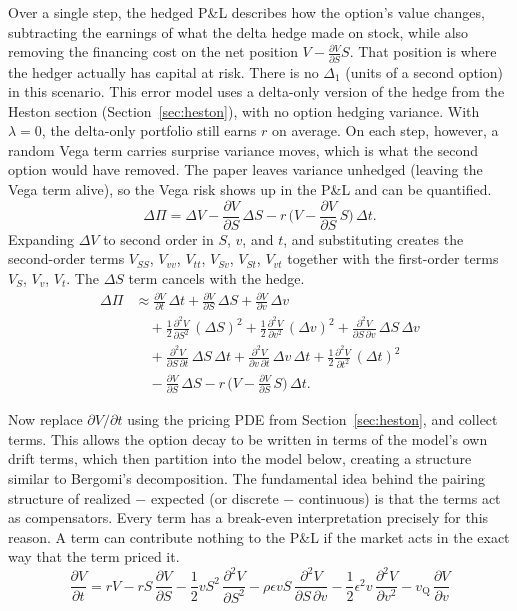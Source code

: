 \documentclass[11pt]{article}
\begin{document}
Over a single step, the hedged P\&L describes how the option's value changes, subtracting the earnings of what the delta hedge made on stock, while also removing the financing cost on the net position $V - \tfrac{\partial V}{\partial S}S$.
That position is where the hedger actually has capital at risk. There is no $\Delta_1$ (units of a second option) in this scenario.
This error model uses a delta-only version of the hedge from the Heston section (Section~\ref{sec:heston}), with no option hedging variance. With $\lambda = 0$, the delta-only portfolio still earns $r$ on average. On each step, however, a random Vega term carries surprise variance moves, which is what the second option would have removed. The paper leaves variance unhedged (leaving the Vega term alive), so the Vega risk shows up in the P\&L and can be quantified.
\[ \Delta\Pi = \Delta V - \frac{\partial V}{\partial S}\,\Delta S - r\,\Big( V - \frac{\partial V}{\partial S}\,S \Big)\,\Delta t .
\] Expanding $\Delta V$ to second order in $S$, $v$, and $t$, and substituting creates the second-order terms $V_{SS}$, $V_{vv}$, $V_{tt}$, $V_{Sv}$, $V_{St}$, $V_{vt}$ together with the first-order terms $V_S$, $V_v$, $V_t$.
The $\Delta S$ term cancels with the hedge.
\begin{align*}
\Delta\Pi &\approx \frac{\partial V}{\partial t}\,\Delta t
+ \frac{\partial V}{\partial S}\,\Delta S
+ \frac{\partial V}{\partial v}\,\Delta v \\
&\quad {} + \frac{1}{2} \frac{\partial^2 V}{\partial S^2}\,(\Delta S)^2
+ \frac{1}{2} \frac{\partial^2 V}{\partial v^2}\,(\Delta v)^2
+ \frac{\partial^2 V}{\partial S\,\partial v}\,\Delta S\,\Delta v \\
&\quad {} + \frac{\partial^2 V}{\partial S\,\partial t}\,\Delta S\,\Delta t
+ \frac{\partial^2 V}{\partial v\,\partial t}\,\Delta v\,\Delta t
+ \frac{1}{2} \frac{\partial^2 V}{\partial t^2}\,(\Delta t)^2 \\
&\quad {} - \frac{\partial V}{\partial S}\,\Delta S
- r\,\Big( V - \frac{\partial V}{\partial S}\,S \Big)\,\Delta t .
\end{align*}

Now replace $\partial V/\partial t$ using the pricing PDE from Section~\ref{sec:heston}, and collect terms.
This allows the option decay to be written in terms of the model's own drift terms, which then partition into the model below, creating a structure similar to Bergomi's
decomposition. The fundamental idea behind the pairing structure of realized $-$ expected (or discrete $-$ continuous) is that the terms act as compensators. Every term has a break-even
interpretation precisely for this reason. A term can contribute nothing to the P\&L if the market acts in the exact way that the term priced it.
\[ \frac{\partial V}{\partial t} = rV - rS\,\frac{\partial V}{\partial S} - \frac{1}{2} v S^2\,\frac{\partial^2 V}{\partial S^2} - \rho \epsilon v S\,\frac{\partial^2 V}{\partial S\,\partial v} - \frac{1}{2} \epsilon^2 v\,\frac{\partial^2 V}{\partial v^2} - v_{\mathrm{Q}}\,\frac{\partial V}{\partial v} \]
\end{document}
